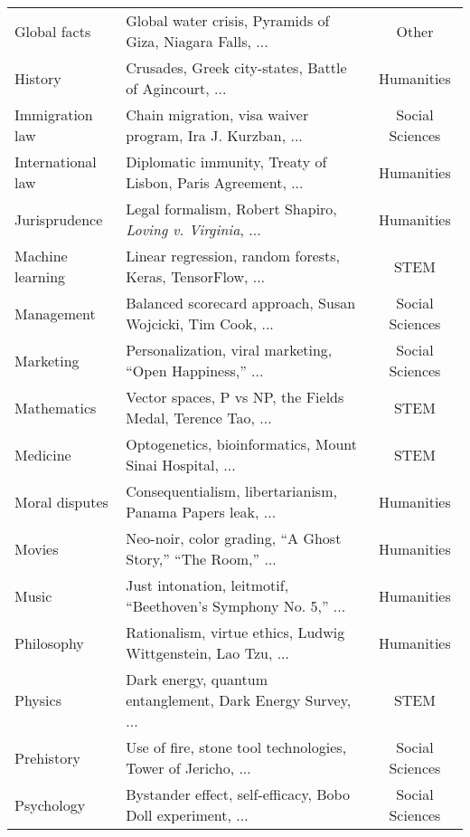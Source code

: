 \begin{table}[th]
\begin{tabular}{l l c}
        Global facts            & Global water crisis, Pyramids of Giza, Niagara Falls, ...         & Other \\
        History                 & Crusades, Greek city-states, Battle of Agincourt, ...             & Humanities \\
        Immigration law         & Chain migration, visa waiver program, Ira J. Kurzban, ...         & Social Sciences \\
        International law       & Diplomatic immunity, Treaty of Lisbon, Paris Agreement, ...       & Humanities \\
        Jurisprudence           & Legal formalism, Robert Shapiro, \textit{Loving v. Virginia}, ... & Humanities \\
        Machine learning        & Linear regression, random forests, Keras, TensorFlow, ...         & STEM \\
        Management              & Balanced scorecard approach, Susan Wojcicki, Tim Cook, ...        & Social Sciences \\
        Marketing               & Personalization, viral marketing, ``Open Happiness,'' ...         & Social Sciences \\
        Mathematics             & Vector spaces, P vs NP, the Fields Medal, Terence Tao, ...        & STEM \\
        Medicine                & Optogenetics, bioinformatics, Mount Sinai Hospital, ...           & STEM \\
        Moral disputes          & Consequentialism, libertarianism, Panama Papers leak, ...         & Humanities \\
        Movies                  & Neo-noir, color grading, ``A Ghost Story,'' ``The Room,'' ...     & Humanities \\
        Music                   & Just intonation, leitmotif, ``Beethoven's Symphony No. 5,'' ...   & Humanities \\
        Philosophy              & Rationalism, virtue ethics, Ludwig Wittgenstein, Lao Tzu, ...     & Humanities \\
        Physics                 & Dark energy, quantum entanglement, Dark Energy Survey, ...        & STEM \\
        Prehistory              & Use of fire, stone tool technologies, Tower of Jericho, ...       & Social Sciences \\
        Psychology              & Bystander effect, self-efficacy, Bobo Doll experiment, ...        & Social Sciences \\

\end{tabular}
\end{table}
